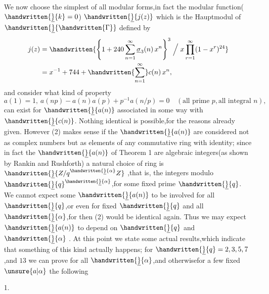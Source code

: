 We now choose the simplest of all modular forms,in fact the modular function($\handwritten{\underline}{k}=0$) $\handwritten{\underline}{j(z)}$ which is the Hauptmodul of $\handwritten{\underline}{\handwritten{\Gamma}}$ defined by
\[
\begin{aligned}
j(z)&=\handwritten{\left\{1+240\sum_{n=1}^{\infty}\underline{\sigma}_{3}(n)\,x^n\right\}^{3}\Bigm/ x\prod_{r=1}^{\infty}(1-x^{r})^{24}}\\
&=x^{-1}+744+\handwritten{\sum_{n=1}^{\infty}}c(n)\,x^n,
\end{aligned}
\]
\reversemarginpar{}\normalmarginpar
and consider what kind of property
\[
a(1)=1,\ a(np)-a(n)a(p)+p^{-1}a(n/p)=0\quad (\text{all prime }p,\text{all integral }n),
\tag*{(2)}
\]
can exist for $\handwritten{\underline}{a(n)}$ associated in some way with $\handwritten{\underline}{c(n)}$. Nothing identical is possible,for the reasons already given. However (2) makes sense if the $\handwritten{\underline}{a(n)}$ are considered not as complex numbers but as elements of any commutative ring with identity; since in fact the $\handwritten{\underline}{a(n)}$ of Theorem 1 are algebraic integers(as shown by Rankin and Rushforth) a natural choice of ring is $\handwritten{\underline}{Z/q^{\handwritten{\underline}{\alpha}}Z}$ ,that is, the integers modulo $\handwritten{\underline}{q}^{\handwritten{\underline}{\alpha}}$,for some fixed prime $\handwritten{\underline}{q}$. We cannot expect some  $\handwritten{\underline}{a(n)}$ to be involved for all $\handwritten{\underline}{q}$,or even for fixed $\handwritten{\underline}{q}$ and all $\handwritten{\underline}{\alpha}$,for then (2) would be identical again. Thus we may expect $\handwritten{\underline}{a(n)}$ to depend on $\handwritten{\underline}{q}$ and $\handwritten{\underline}{\alpha}$ . At this point we  state some actual results,which indicate that something of this kind actually happens; for $\handwritten{\underline}{q}=2,3,5,7$,and $13$ we can prove for all $\handwritten{\underline}{\alpha}$,and otherwisefor a few fixed $\unsure{a|\alpha}$ the following



 1.

